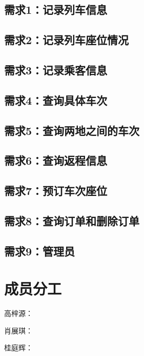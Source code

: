 \documentclass[UTF-8,twoside,cs4size]{ctexart}
\begin{document}
    \subsection{需求\textbf{1}：记录列车信息}
    
    \subsection{需求\textbf{2}：记录列车座位情况}
    
    \subsection{需求\textbf{3}：记录乘客信息}
    
    \subsection{需求\textbf{4}：查询具体车次}
    
    \subsection{需求\textbf{5}：查询两地之间的车次}
    
    \subsection{需求\textbf{6}：查询返程信息}
    
    \subsection{需求\textbf{7}：预订车次座位}
    
    \subsection{需求\textbf{8}：查询订单和删除订单}
    
    \subsection{需求\textbf{9}：管理员}
    
    \section*{成员分工}
    
    高梓源：
    
    肖展琪：
    
    桂庭辉：
    
\end{document}
